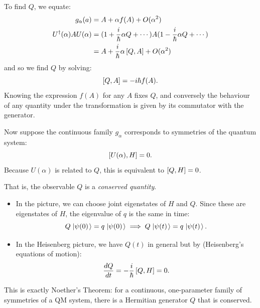 \documentclass[../Main.tex]{subfiles}
\begin{document}
To find $Q$, we equate:
\begin{align*}
    g_\alpha(a) &= A + \alpha f(A) + O(\alpha^2) \\
    U^\dagger(\alpha) A U(\alpha) &= (1 + \frac{i}{\hbar} \alpha Q + \cdots) A (1 - \frac i \hbar \alpha Q + \cdots) \\
    &= A + \frac{i}{\hbar} \alpha \left[Q, A\right] + O(\alpha^2)
\end{align*}
and so we find $Q$ by solving:
\begin{equation*}
    \left[Q, A\right] = -i\hbar f(A).
\end{equation*}
Knowing the expression $f(A)$ for any $A$ fixes $Q$, and conversely the behaviour of any quantity under the transformation is given by its commutator with the generator.

Now suppose the continuous family $g_\alpha$ corresponds to symmetries of the quantum system:
\begin{equation*}
    \left[U(\alpha), H\right] = 0.
\end{equation*}
Because $U(\alpha)$ is related to $Q$, this is equivalent to $\left[Q, H\right] = 0$.

That is, the observable $Q$ is a \textit{conserved quantity}.
\begin{itemize}
    \item In the \schr picture, we can choose joint eigenstates of $H$ and $Q$. Since these are eigenstates of $H$, the eigenvalue of $q$ is the same in time:
    \begin{equation*}
        Q\left.\left|\psi(0)\right.\right\rangle = q\left.\left|\psi(0)\right.\right\rangle \implies Q \left.\left|\psi(t)\right.\right\rangle = q\left.\left|\psi(t)\right.\right\rangle.
    \end{equation*}
    \item In the Heisenberg picture, we have $Q(t)$ in general but by  (Heisenberg's equations of motion):
        \begin{equation*}
            \frac{dQ}{dt} = -\frac{i}{\hbar} \left[Q, H\right] = 0.
        \end{equation*}
\end{itemize}
This is exactly Noether's Theorem: for a continuous, one-parameter family of symmetries of a QM system, there is a Hermitian generator $Q$ that is conserved.
\end{document}
